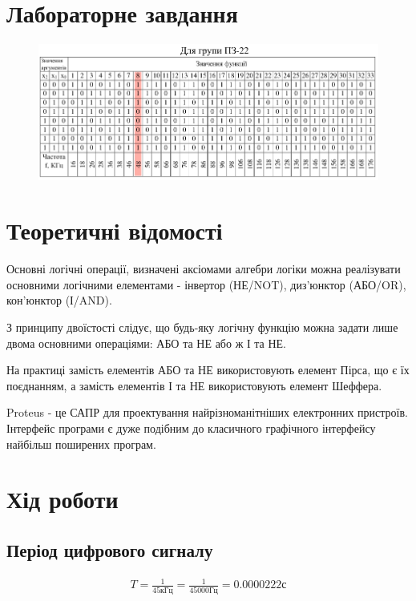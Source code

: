 \documentclass{article}
\begin{document}
\begin{normalsize}
	\section*{Лабораторне завдання}
	\begin{figure}[H]
		\centering
		\includegraphics[scale=0.75]{v}
	\end{figure}	

	\section*{Теоретичні відомості}
	Основні логічні операції, визначені аксіомами алгебри логіки можна реалізувати основними логічними елементами - інвертор (НЕ/NOT), диз'юнктор (АБО/OR), кон'юнктор (І/AND).
	
	З принципу двоїстості слідує, що будь-яку логічну функцію можна задати лише двома основними операціями: АБО та НЕ або ж І та НЕ.
	
	На практиці замість елементів АБО та НЕ використовують елемент Пірса, що є їх поєднанням, а замість елементів І та НЕ використовують елемент Шеффера.
	
	Proteus - це САПР для проектування найрізноманітніших електронних пристроїв.
	Інтерфейс програми є дуже подібним до класичного графічного інтерфейсу найбільш поширених програм.
	
	\section*{Хід роботи}
	\subsection*{Період цифрового сигналу}
	\begin{large}
		\begin{gather}
			T=\frac{1}{45\text{кГц}}=\frac{1}{45000\text{Гц}}=0.0000222\text{с}\nonumber
		\end{gather}
	\end{large}


\end{normalsize}
\end{document}
